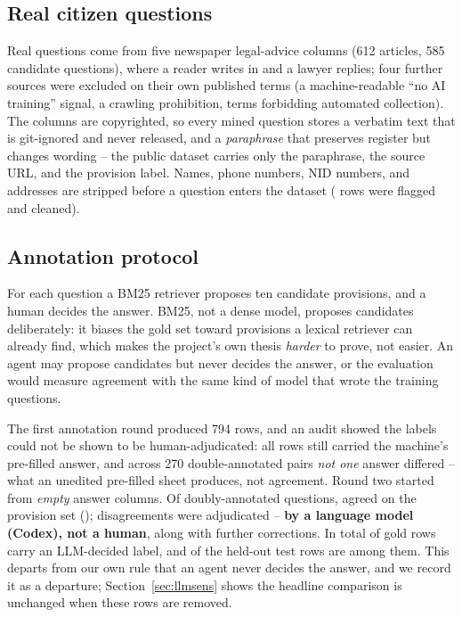 \documentclass[10pt,a4paper]{article}
\begin{document}
\subsection{Real citizen questions}
Real questions come from five newspaper legal-advice columns (612 articles, 585 candidate questions), where a reader writes in and a lawyer replies; four further sources were excluded on their own published terms (a machine-readable ``no AI training'' signal, a crawling prohibition, terms forbidding automated collection). The columns are copyrighted, so every mined question stores a verbatim text that is git-ignored and never released, and a \emph{paraphrase} that preserves register but changes wording -- the public dataset carries only the paraphrase, the source URL, and the provision label. Names, phone numbers, NID numbers, and addresses are stripped before a question enters the dataset (\nPiiFlagged{} rows were flagged and cleaned).

\subsection{Annotation protocol}
For each question a BM25 retriever proposes ten candidate provisions, and a human decides the answer. BM25, not a dense model, proposes candidates deliberately: it biases the gold set toward provisions a lexical retriever can already find, which makes the project's own thesis \emph{harder} to prove, not easier. An agent may propose candidates but never decides the answer, or the evaluation would measure agreement with the same kind of model that wrote the training questions.

\begin{caution}
The first annotation round produced 794 rows, and an audit showed the labels could not be shown to be human-adjudicated: all rows still carried the machine's pre-filled answer, and across 270 double-annotated pairs \emph{not one} answer differed -- what an unedited pre-filled sheet produces, not agreement. Round two started from \emph{empty} answer columns. Of \nDoubleAnnotated{} doubly-annotated questions, \nAgreeProvision{} agreed on the provision set (\pctAgreeProvision); \nAdjudicated{} disagreements were adjudicated -- \textbf{by a language model (Codex), not a human}, along with \nLlmCorrections{} further corrections. In total \nLlmLabelled{} of \nGold{} gold rows carry an LLM-decided label, and \nTestLlm{} of the \nTest{} held-out test rows are among them. This departs from our own rule that an agent never decides the answer, and we record it as a departure; Section~\ref{sec:llmsens} shows the headline comparison is unchanged when these rows are removed.
\end{caution}
\end{document}
